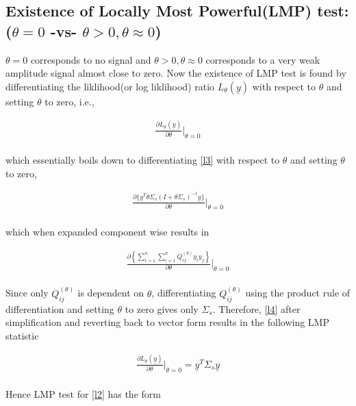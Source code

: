\documentclass[12pt]{report}
\begin{document}
\subsection{Existence of Locally Most Powerful(LMP) test: ($\theta=0$ -vs- $\theta > 0, \theta \approx 0$)}
$\theta=0$ corresponds to no signal and $\theta > 0, \theta \approx 0$ corresponds to a very weak amplitude signal almost close to zero. Now the existence of LMP test is found by differentiating the liklihood(or log liklihood) ratio $L_\theta({\underline{y}})$ with respect to $\theta$ and setting $\theta$ to zero, i.e.,
 
\begin{equation}
\begin{aligned}
\frac{\partial L_\theta({\underline{y}})}{\partial \theta}\Bigr|_{\theta = 0}
\end{aligned}
\end{equation}\\
which essentially boils down to differentiating  \eqref{l3} with respect to $\theta$ and setting $\theta$ to zero,
 
\begin{equation}
\begin{aligned}
\frac{\partial \{{\underline{y}}^T\theta\Sigma_s(I+\theta\Sigma_s)^{-1}{\underline{y}}\}}{\partial \theta}\Bigr|_{\theta = 0}
\end{aligned}
\end{equation}\\
which when expanded component wise results in
 
\begin{equation}
\label{l4}
\begin{aligned}
\frac{\partial\left\{\sum\limits_{i=1}^{n}\sum\limits_{i=1}^{n}Q^{(\theta)}_{ij}y_iy_j \right\}}{\partial \theta}\Bigr|_{\theta = 0}
\end{aligned}
\end{equation}\\
Since only $Q^{(\theta)}_{ij}$ is dependent on $\theta$, differentiating $Q^{(\theta)}_{ij}$ using the product rule of differentiation and setting $\theta$ to zero gives only $\Sigma_s$. Therefore, \eqref{l4} after simplification and reverting back to vector form results in the following LMP statistic

\begin{equation}
\label{l6}
\begin{aligned}
\frac{\partial L_\theta({\underline{y}})}{\partial \theta}\Bigr|_{\theta = 0}={\underline{y}}^T\Sigma_s{\underline{y}}
\end{aligned}
\end{equation}\\
Hence LMP test for \eqref{l2} has the form
 
\end{document}
